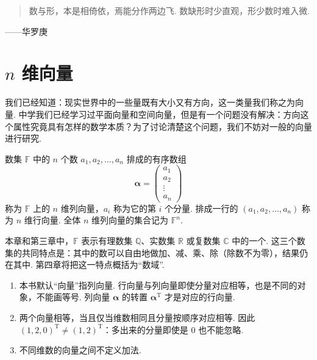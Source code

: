 \documentclass[lang=cn,10.5pt,scheme=chinese,toc=twocol,section,chinesefont=nofont,
twoside,citestyle=gb7714-2015,bibstyle=gb7714-2015]{elegantbook}
\DeclareRobustCommand{\textbf}[1]{{\lnsemiboldlatin\lnsemiboldcjk #1}}
\newcommand{\vv}[1]{\boldsymbol{#1}}
\newcommand{\trans}{\mathrm{T}}             %
\numberwithin{equation}{section}   %
\begin{document}
\newpage

\begin{tcolorbox}[epigraph]
  \begin{quote}
    数与形，本是相倚依，焉能分作两边飞. 数缺形时少直观，形少数时难入微.
  \end{quote}
  \begin{flushright}
    ——华罗庚\footnotemark
  \end{flushright}
\end{tcolorbox}

\section{\texorpdfstring{$n$}{n} 维向量}\label{sec:nvec}

我们已经知道：现实世界中的一些量既有大小又有方向，这一类量我们称之为向量. 中学我们已经学习过平面向量和空间向量，但是有一个问题没有解决：方向这个属性究竟具有怎样的数学本质？为了讨论清楚这个问题，我们不妨对一般的向量进行研究.

\begin{definition}
  \label{def:vec}
  数集 $\mathbb{F}$ 中的 $n$ 个数 $a_1,a_2,\ldots,a_n$ 排成的有序数组
  \[\vv{\alpha}=
    \begin{pmatrix}
      a_1 \\ a_2 \\ \vdots \\ a_n
    \end{pmatrix}
  \]
  称为 $\mathbb{F}$ 上的 $n$ 维\textbf{列向量}，$a_i$ 称为它的第 $i$ 个分量. 排成一行的 $(a_1,a_2,\ldots,a_n)$ 称为 $n$ 维\textbf{行向量}. 全体 $n$ 维列向量的集合记为 $\mathbb{F}^n$.
\end{definition}

本章和第三章中，$\mathbb{F}$ 表示有理数集 $\mathbb{Q}$、实数集 $\mathbb{R}$ 或复数集 $\mathbb{C}$ 中的一个. 这三个数集的共同特点是：其中的数可以自由地做加、减、乘、除（除数不为零），结果仍在其中. 第四章将把这一特点概括为“数域”.

\begin{pitfallbox}
  \begin{enumerate}
    \item 本书默认“向量”指列向量. 行向量与列向量即使分量对应相等，也是\textbf{不同}的对象，不能画等号. 列向量 $\vv\alpha$ 的转置 $\vv\alpha^\trans$ 才是对应的行向量.
    \item 两个向量相等，当且仅当维数相同且分量按顺序对应相等. 因此 $(1,2,0)^\trans\ne(1,2)^\trans$：多出来的分量即使是 $0$ 也不能忽略.
    \item 不同维数的向量之间不定义加法.
  \end{enumerate}
\end{pitfallbox}
\end{document}
